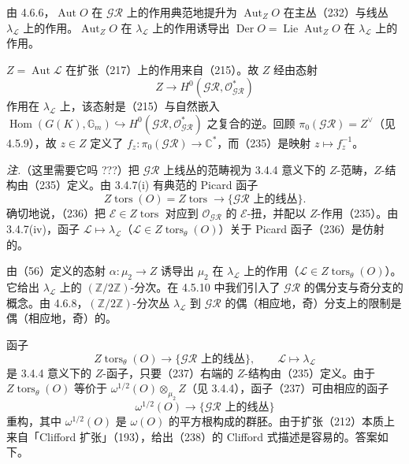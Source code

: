 
 由 4.6.6，$\operatorname{Aut}O$ 在 $\mathcal{GR}$ 上的作用典范地提升为 $\operatorname{Aut}_Z O$ 在主丛（232）与线丛 $\lambda_{\mathcal{L}}$ 上的作用。$\operatorname{Aut}_Z O$ 在 $\lambda_{\mathcal{L}}$ 上的作用诱导出 $\operatorname{Der}O=\operatorname{Lie}\operatorname{Aut}_Z O$ 在 $\lambda_{\mathcal{L}}$ 上的作用。

 $Z=\operatorname{Aut}\mathcal{L}$ 在扩张（217）上的作用来自（215）。故 $Z$ 经由态射
\begin{equation}\tag{235}
Z\to H^0(\mathcal{GR},\mathcal{O}^*_{\mathcal{GR}})
\end{equation}
作用在 $\lambda_{\mathcal{L}}$ 上，该态射是（215）与自然嵌入 $\operatorname{Hom}(G(K),\mathbb{G}_m)\hookrightarrow H^0(\mathcal{GR},\mathcal{O}^*_{\mathcal{GR}})$ 之复合的逆。回顾 $\pi_0(\mathcal{GR})=Z^{\vee}$（见 4.5.9），故 $z\in Z$ 定义了 $f_z:\pi_0(\mathcal{GR})\to\mathbb{C}^*$，而（235）是映射 $z\mapsto f_z^{-1}$。

 \emph{注.}（这里需要它吗 ???）把 $\mathcal{GR}$ 上线丛的范畴视为 3.4.4 意义下的 $Z$-范畴，$Z$-结构由（235）定义。由 3.4.7(i) 有典范的 Picard 函子
\begin{equation}\tag{236}
Z\operatorname{tors}(O)=Z\operatorname{tors}\to\{\text{$\mathcal{GR}$ 上的线丛}\}.
\end{equation}
确切地说，（236）把 $\mathcal{E}\in Z\operatorname{tors}$ 对应到 $\mathcal{O}_{\mathcal{GR}}$ 的 $\mathcal{E}$-扭，并配以 $Z$-作用（235）。由 3.4.7(iv)，函子 $\mathcal{L}\mapsto\lambda_{\mathcal{L}}$（$\mathcal{L}\in Z\operatorname{tors}_\theta(O)$）关于 Picard 函子（236）是仿射的。

 由（56）定义的态射 $\alpha:\mu_2\to Z$ 诱导出 $\mu_2$ 在 $\lambda_{\mathcal{L}}$ 上的作用（$\mathcal{L}\in Z\operatorname{tors}_\theta(O)$）。它给出 $\lambda_{\mathcal{L}}$ 上的 $(\mathbb{Z}/2\mathbb{Z})$-分次。在 4.5.10 中我们引入了 $\mathcal{GR}$ 的偶分支与奇分支的概念。由 4.6.8，$(\mathbb{Z}/2\mathbb{Z})$-分次丛 $\lambda_{\mathcal{L}}$ 到 $\mathcal{GR}$ 的偶（相应地，奇）分支上的限制是偶（相应地，奇）的。

 函子
\begin{equation}\tag{237}
Z\operatorname{tors}_\theta(O)\to\{\text{$\mathcal{GR}$ 上的线丛}\},\qquad \mathcal{L}\mapsto\lambda_{\mathcal{L}}
\end{equation}
是 3.4.4 意义下的 $Z$-函子，只要（237）右端的 $Z$-结构由（235）定义。由于 $Z\operatorname{tors}_\theta(O)$ 等价于 $\omega^{1/2}(O)\otimes_{\mu_2}Z$（见 3.4.4），函子（237）可由相应的函子
\begin{equation}\tag{238}
\omega^{1/2}(O)\to\{\text{$\mathcal{GR}$ 上的线丛}\}
\end{equation}
重构，其中 $\omega^{1/2}(O)$ 是 $\omega(O)$ 的平方根构成的群胚。由于扩张（212）本质上来自「Clifford 扩张」（193），给出（238）的 Clifford 式描述是容易的。答案如下。

